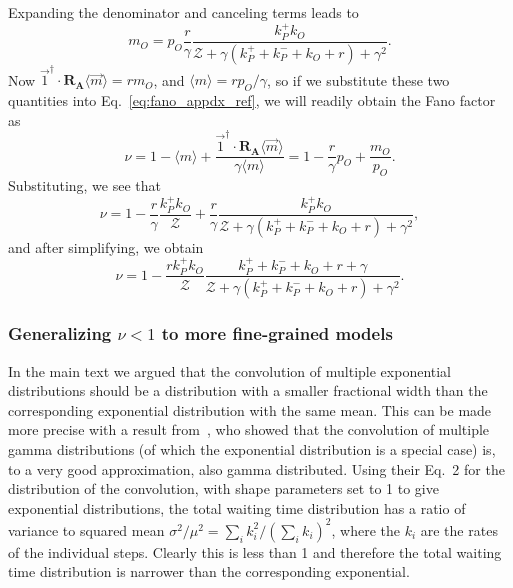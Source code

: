 Expanding the denominator and canceling terms leads to
\begin{equation}
m_O = p_O \frac{r}{\gamma} \frac{k_P^+ k_O}
    {\mathcal{Z} + \gamma(k_P^+ + k_P^- + k_O + r) + \gamma^2}.
\end{equation}
Now $\vec{1}^\dagger\cdot\mathbf{R_A}\langle\vec{m}\rangle = r m_O$, and
$\langle{m}\rangle = rp_O/\gamma$, so if we substitute these two quantities into
Eq.~\ref{eq:fano_appdx_ref}, we will readily obtain the Fano factor as
\begin{equation}
\nu = 1 - \langle{m}\rangle
    + \frac{\vec{1}^\dagger\cdot\mathbf{R_A}\langle\vec{m}\rangle}
            {\gamma \langle{m}\rangle}
= 1 - \frac{r}{\gamma}p_O + \frac{m_O}{p_O}.
\end{equation}
Substituting, we see that
\begin{equation}
\nu = 1 - \frac{r}{\gamma} \frac{k_P^+ k_O}{\mathcal{Z}}
    + \frac{r}{\gamma}
    \frac{k_P^+ k_O}
            {\mathcal{Z} + \gamma(k_P^+ + k_P^- + k_O + r) + \gamma^2},
\end{equation}
and after simplifying, we obtain
\begin{equation}
\nu = 1 - \frac{r k_P^+ k_O}{\mathcal{Z}}
        \frac{k_P^+ + k_P^- + k_O + r + \gamma}
            {\mathcal{Z} + \gamma(k_P^+ + k_P^- + k_O + r) + \gamma^2}.
\end{equation}

\subsubsection{Generalizing $\nu<1$ to more fine-grained models}
In the main text we argued that the convolution of multiple
exponential distributions should be a distribution with a smaller
fractional width than the corresponding exponential distribution
with the same mean.
This can be made more precise with a result from~\cite{Stewart2007},
who showed that the convolution of multiple gamma distributions (of which the
exponential distribution is a special case) is, to a very good approximation,
also gamma distributed. Using their Eq.~2 for the distribution of the
convolution, with shape parameters set to 1 to give exponential distributions,
the total waiting time distribution has a ratio of variance to squared mean
$\sigma^2/\mu^2 = \sum_i k_i^2/\left(\sum_i k_i\right)^2$, where the $k_i$ are
the rates of the individual steps. Clearly this is less than 1 and therefore the
total waiting time distribution is narrower than the corresponding exponential.

